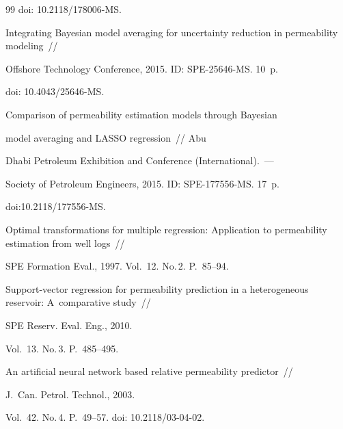 {{\begin{thebibliography}{99}
doi: 10.2118/178006-MS.

    



    Integrating Bayesian model averaging for uncertainty reduction in permeability modeling~/\!\!/ 

    Offshore Technology Conference, 2015. ID: SPE-25646-MS. 10~p.

    doi: 10.4043/25646-MS.

    



Comparison of permeability estimation models through Bayesian 

model averaging and LASSO regression~/\!\!/ Abu 

Dhabi  Petroleum Exhibition and Conference (International).~--- 

Society of Petroleum Engineers, 2015. ID: SPE-177556-MS. 17~p.

doi:10.2118/177556-MS.

    



Optimal transformations for multiple regression: Application to permeability estimation from well logs~/\!\!/ 

SPE Formation Eval., 1997. Vol.~12. No.\,2. P.~85--94.

    



Support-vector regression for permeability prediction in a heterogeneous reservoir: A~comparative study~/\!\!/ 

SPE Reserv. Eval. Eng., 2010. 

Vol.~13. No.\,3. P.~485--495.

    

    

    



An artificial neural network based relative permeability predictor~/\!\!/ 

J.~Can. Petrol. Technol., 2003. 

Vol.~42. No.\,4. P.~49--57. doi: 10.2118/03-04-02.


\end{thebibliography}}}
